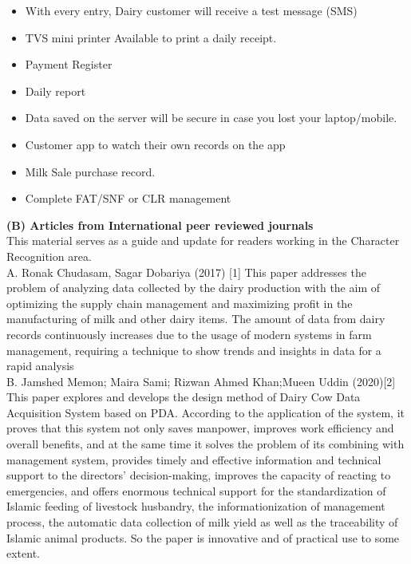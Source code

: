 \documentclass[english]{article}
\begin{document}
\begin{itemize}
\item With every entry, Dairy customer will receive a test message (SMS)
\item TVS mini printer Available to print a daily receipt.
\item Payment Register
\item Daily report
\item Data saved on the server will be secure in case you lost your laptop/mobile. \item Customer app to watch their own records on the app
\item  Milk Sale purchase record.
\item  Complete FAT/SNF or CLR management

\end{itemize}
\textbf{(B)	Articles from International peer reviewed journals} \\
This material serves as a guide and update for readers working in the Character Recognition area.\\
A.	Ronak Chudasam, Sagar Dobariya (2017) [1]  This paper addresses the problem of analyzing data collected by the dairy production with the aim of optimizing the supply chain management and maximizing profit in the manufacturing of milk and other dairy items. The amount of data from dairy records continuously increases due to the usage of modern systems in farm management, requiring a technique to show trends and insights in data for a rapid analysis\\
B.	Jamshed Memon; Maira Sami; Rizwan Ahmed Khan;Mueen Uddin (2020)[2] This paper explores and develops the design method of Dairy Cow Data Acquisition System based on PDA. According to the application of the system, it proves that this system not only saves manpower, improves work efficiency and overall benefits, and at the same time it solves the problem of its combining with management system, provides timely and effective information and technical support to the directors' decision-making, improves the capacity of reacting to emergencies, and offers enormous technical support for the standardization of Islamic feeding of livestock husbandry, the informationization of management process, the automatic data collection of milk yield as well as the traceability of Islamic animal products. So the paper is innovative and of practical use to some extent.
 

\\\\
\end{document}
